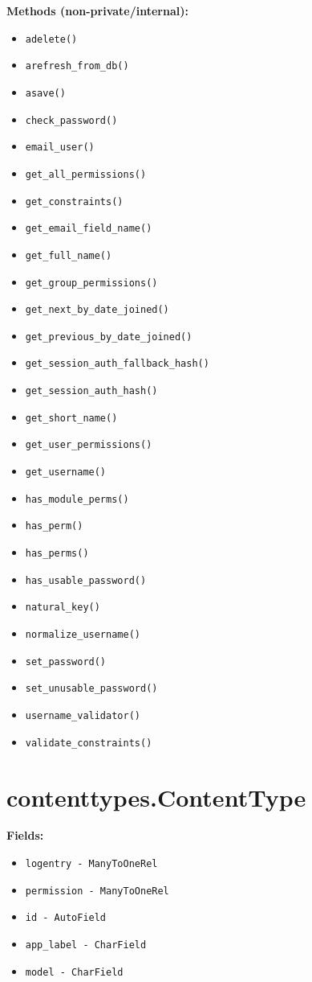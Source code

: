 \documentclass[oneside,openany,obeyspaces]{book}
\begin{document}
\begin{flushleft}
    \textbf{Methods (non-private/internal):}
    \begin{itemize}
        \item \texttt{adelete()}
        \item \texttt{arefresh\_from\_db()}
        \item \texttt{asave()}
        \item \texttt{check\_password()}
        \item \texttt{email\_user()}
        \item \texttt{get\_all\_permissions()}
        \item \texttt{get\_constraints()}
        \item \texttt{get\_email\_field\_name()}
        \item \texttt{get\_full\_name()}
        \item \texttt{get\_group\_permissions()}
        \item \texttt{get\_next\_by\_date\_joined()}
        \item \texttt{get\_previous\_by\_date\_joined()}
        \item \texttt{get\_session\_auth\_fallback\_hash()}
        \item \texttt{get\_session\_auth\_hash()}
        \item \texttt{get\_short\_name()}
        \item \texttt{get\_user\_permissions()}
        \item \texttt{get\_username()}
        \item \texttt{has\_module\_perms()}
        \item \texttt{has\_perm()}
        \item \texttt{has\_perms()}
        \item \texttt{has\_usable\_password()}
        \item \texttt{natural\_key()}
        \item \texttt{normalize\_username()}
        \item \texttt{set\_password()}
        \item \texttt{set\_unusable\_password()}
        \item \texttt{username\_validator()}
        \item \texttt{validate\_constraints()}
    \end{itemize}

    \section*{contenttypes.ContentType}
    \textbf{Fields:}
    \begin{itemize}
        \item \texttt{logentry - ManyToOneRel}
        \item \texttt{permission - ManyToOneRel}
        \item \texttt{id - AutoField}
        \item \texttt{app\_label - CharField}
        \item \texttt{model - CharField}
    \end{itemize}


\end{flushleft}
\end{document}
